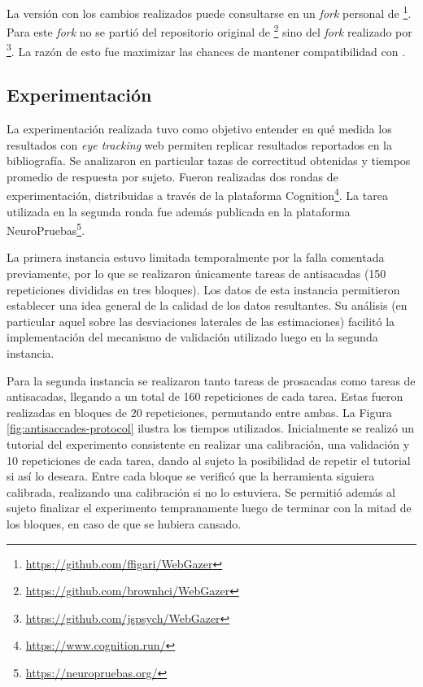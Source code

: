 La versión con los cambios realizados puede consultarse en un \textit{fork}
personal de \webgazer\footnote{\url{https://github.com/ffigari/WebGazer}}.
Para este \textit{fork} no se partió del repositorio original de
\webgazer\footnote{\url{https://github.com/brownhci/WebGazer}} sino del
\textit{fork} realizado por
\jspsych\footnote{\url{https://github.com/jspsych/WebGazer}}.
La razón de esto fue maximizar las chances de mantener compatibilidad con
\jspsych.

\subsection{Experimentación}

La experimentación realizada tuvo como objetivo entender en qué medida los
resultados con \textit{eye tracking} web permiten replicar resultados
reportados en la bibliografía.
Se analizaron en particular tazas de correctitud obtenidas y tiempos promedio
de respuesta por sujeto.
Fueron realizadas dos rondas de experimentación, distribuidas a través de la
plataforma Cognition\footnote{\url{https://www.cognition.run/}}.
La tarea utilizada en la segunda ronda fue además publicada en la plataforma
NeuroPruebas\footnote{\url{https://neuropruebas.org/}}.

La primera instancia estuvo limitada temporalmente por la falla comentada
previamente, por lo que se realizaron únicamente tareas de antisacadas (150
repeticiones divididas en tres bloques).
Los datos de esta instancia permitieron establecer una idea general de la
calidad de los datos resultantes.
Su análisis (en particular aquel sobre las desviaciones laterales de las
estimaciones) facilitó la implementación del mecanismo de validación utilizado
luego en la segunda instancia.

Para la segunda instancia se realizaron tanto tareas de prosacadas como tareas
de antisacadas, llegando a un total de 160 repeticiones de cada tarea.
Estas fueron realizadas en bloques de 20 repeticiones, permutando entre ambas.
La Figura \ref{fig:antisaccades-protocol} ilustra los tiempos utilizados.
Inicialmente se realizó un tutorial del experimento consistente en realizar una
calibración, una validación y 10 repeticiones de cada tarea, dando al sujeto la
posibilidad de repetir el tutorial si así lo deseara.
Entre cada bloque se verificó que la herramienta siguiera calibrada, realizando
una calibración si no lo estuviera.
Se permitió además al sujeto finalizar el experimento tempranamente luego de
terminar con la mitad de los bloques, en caso de que se hubiera cansado.

